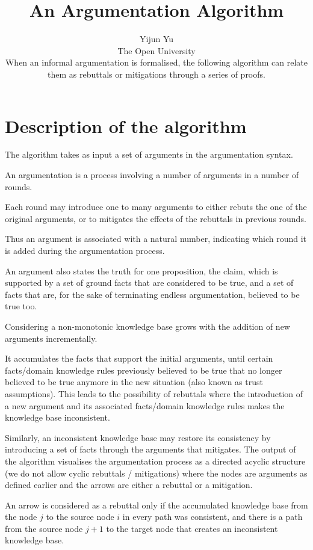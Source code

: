 \documentclass[acmtocl]{acmtrans2m}
\title{An Argumentation Algorithm}
\author{Yijun Yu\\The Open University\\    
   When an informal argumentation is formalised, the following algorithm can
   relate them as rebuttals or mitigations through a series of proofs. 
   }
\begin{document}
\maketitle
\section{Description of the algorithm}
The algorithm takes as input a set of arguments in the argumentation syntax. 

An argumentation is a process involving a number of arguments in a number of rounds.
 
Each round may introduce one to many arguments to either rebuts the one of the original arguments,  or to mitigates the effects of the rebuttals in previous rounds. 

Thus an argument is associated with a natural number,  indicating which round it is added during the argumentation process. 

An argument also states the truth for one proposition,  the claim,  which is supported by a set of ground facts that are considered to be true,  and a set of facts that are,  for the sake of terminating endless argumentation,  believed to be true too. 

Considering a non-monotonic knowledge base grows with the addition of new arguments incrementally. 

It accumulates the facts that support the initial arguments,  until certain facts/domain knowledge rules previously believed to be true that no longer believed to be true anymore in the new situation (also known as trust assumptions). This leads to the possibility of rebuttals where the introduction of a new argument and its associated facts/domain knowledge rules makes the knowledge base inconsistent. 

Similarly,  an inconsistent knowledge base may restore its consistency by introducing a set of facts through the arguments that mitigates.  The output of the algorithm visualises the argumentation process as a directed acyclic structure (we do not allow cyclic rebuttals / mitigations) where the nodes are arguments as defined earlier and the arrows are either a rebuttal or a mitigation. 

An arrow is considered as a rebuttal only if the accumulated knowledge base from the node $j$ to the source node $i$ in every path was consistent,  and there is a path from the source node $j+1$ to the target node that creates an inconsistent knowledge base. 
\end{document}
